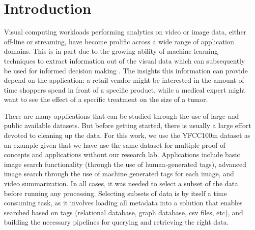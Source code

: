 \section{Introduction}
\label{intro}

Visual computing workloads performing analytics on
video or image data, either off-line or streaming,
have become prolific across a wide range of application domains.
This is in part due to the growing ability of machine learning techniques to
extract information out of the visual data which can subsequently be used
for informed decision making \cite{vdms-nips}.
The insights this information can provide depend on the
application: a retail vendor might be interested in the amount of time
shoppers spend in front of a specific product, while a medical expert might
want to see the effect of a specific treatment on the size of a tumor.

There are many applications that can be studied through the use of large
and public available datasets. But before getting started, there is usually
a large effort devoted to cleaning up the data. For this work, we use
the YFCC100m dataset as an example given that we have use the same dataset
for multiple proof of concepts and applications without our research lab.
Applications include basic image search functionality (through the use
of human-generated tags), advanced image search through the use of
machine generated tags for each image, and video summarization.
In all cases, it was needed to select a subset of the data before running
any processing. Selecting subsets of data is by itself a time consuming task,
as it involves loading all metadata into a solution that enables searched
based on tags (relational database, graph database, csv files, etc), and
building the necessary pipelines for querying and retrieving the right data.

